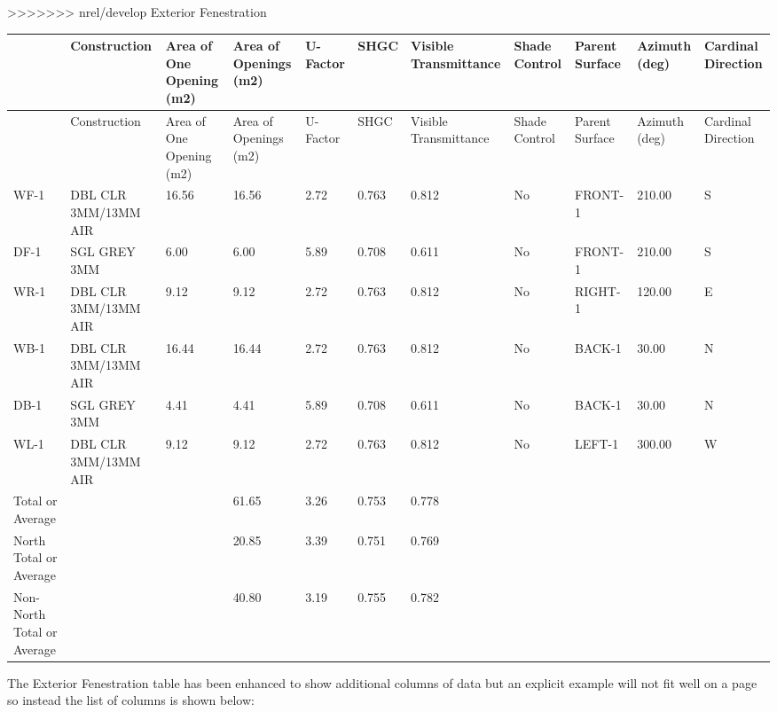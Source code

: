 >>>>>>> nrel/develop
Exterior Fenestration

{\scriptsize
\begin{longtable}[c]{>{\raggedright}p{0.5in}>{\raggedright}p{0.5in}>{\raggedright}p{0.5in}>{\raggedright}p{0.5in}>{\raggedright}p{0.5in}>{\raggedright}p{0.5in}>{\raggedright}p{0.5in}>{\raggedright}p{0.5in}>{\raggedright}p{0.5in}>{\raggedright}p{0.5in}>{\raggedright}p{0.5in}}
\toprule
~ & Construction & Area of One Opening (m2) & Area of Openings (m2) & U-Factor & SHGC & Visible Transmittance & Shade Control & Parent Surface & Azimuth (deg) & Cardinal Direction \tabularnewline
\midrule
\endfirsthead

\toprule
~ & Construction & Area of One Opening (m2) & Area of Openings (m2) & U-Factor & SHGC & Visible Transmittance & Shade Control & Parent Surface & Azimuth (deg) & Cardinal Direction \tabularnewline
\midrule
\endhead

WF-1 & DBL CLR 3MM/13MM AIR & 16.56 & 16.56 & 2.72 & 0.763 & 0.812 & No & FRONT-1 & 210.00 & S \tabularnewline
DF-1 & SGL GREY 3MM & 6.00 & 6.00 & 5.89 & 0.708 & 0.611 & No & FRONT-1 & 210.00 & S \tabularnewline
WR-1 & DBL CLR 3MM/13MM AIR & 9.12 & 9.12 & 2.72 & 0.763 & 0.812 & No & RIGHT-1 & 120.00 & E \tabularnewline
WB-1 & DBL CLR 3MM/13MM AIR & 16.44 & 16.44 & 2.72 & 0.763 & 0.812 & No & BACK-1 & 30.00 & N \tabularnewline
DB-1 & SGL GREY 3MM & 4.41 & 4.41 & 5.89 & 0.708 & 0.611 & No & BACK-1 & 30.00 & N \tabularnewline
WL-1 & DBL CLR 3MM/13MM AIR & 9.12 & 9.12 & 2.72 & 0.763 & 0.812 & No & LEFT-1 & 300.00 & W \tabularnewline
Total or Average & ~ & ~ & 61.65 & 3.26 & 0.753 & 0.778 & ~ & ~ & ~ & ~ \tabularnewline
North Total or Average & ~ & ~ & 20.85 & 3.39 & 0.751 & 0.769 & ~ & ~ & ~ & ~ \tabularnewline
Non-North Total or Average & ~ & ~ & 40.80 & 3.19 & 0.755 & 0.782 & ~ & ~ & ~ & ~ \tabularnewline
\bottomrule
\end{longtable}}

The Exterior Fenestration table has been enhanced to show additional columns of data but an explicit example will not fit well on a page so instead the list of columns is shown below:

